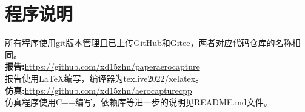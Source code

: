 \section{程序说明}
所有程序使用git版本管理且已上传GitHub和Gitee，两者对应代码仓库的名称相同。 \\
\textbf{报告:}\url{https://github.com/xd15zhn/paperaerocapture} \\
报告使用\LaTeX 编写，编译器为texlive2022/xelatex。\\
\textbf{仿真:}\url{https://github.com/xd15zhn/aerocapturecpp} \\
仿真程序使用C++编写，依赖库等进一步的说明见README.md文件。 \\


